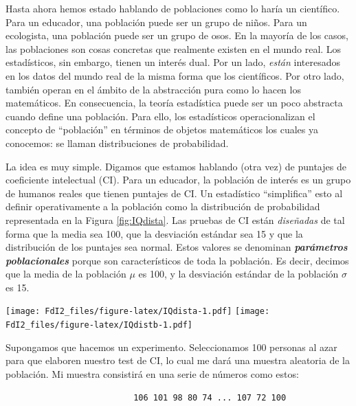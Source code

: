 \documentclass[spanish,]{book}
\begin{document}
Hasta ahora hemos estado hablando de poblaciones como lo haría un
científico. Para un educador, una población puede ser un grupo de niños.
Para un ecologista, una población puede ser un grupo de osos. En la
mayoría de los casos, las poblaciones son cosas concretas que realmente
existen en el mundo real. Los estadísticos, sin embargo, tienen un
interés dual. Por un lado, \emph{están} interesados en los datos del
mundo real de la misma forma que los científicos. Por otro lado, también
operan en el ámbito de la abstracción pura como lo hacen los
matemáticos. En consecuencia, la teoría estadística puede ser un poco
abstracta cuando define una población. Para ello, los estadísticos
operacionalizan el concepto de ``población'' en términos de objetos
matemáticos los cuales ya conocemos: se llaman distribuciones de
probabilidad.

La idea es muy simple. Digamos que estamos hablando (otra vez) de
puntajes de coeficiente intelectual (CI). Para un educador, la población
de interés es un grupo de humanos reales que tienen puntajes de CI. Un
estadístico ``simplifica'' esto al definir operativamente a la población
como la distribución de probabilidad representada en la Figura
\ref{fig:IQdista}. Las pruebas de CI están \emph{diseñadas} de tal forma
que la media sea 100, que la desviación estándar sea 15 y que la
distribución de los puntajes sea normal. Estos valores se denominan
\textbf{\emph{parámetros poblacionales}} porque son característicos de
toda la población. Es decir, decimos que la media de la población
\(\mu\) es 100, y la desviación estándar de la población \(\sigma\) es
15.

\texttt{[image: FdI2\_files/figure-latex/IQdista-1.pdf]}
\texttt{[image: FdI2\_files/figure-latex/IQdistb-1.pdf]}

Supongamos que hacemos un experimento. Seleccionamos 100 personas al
azar para que elaboren nuestro test de CI, lo cual me dará una muestra
aleatoria de la población. Mi muestra consistirá en una serie de números
como estos:

\begin{verbatim}
                          106 101 98 80 74 ... 107 72 100
\end{verbatim}
\end{document}

